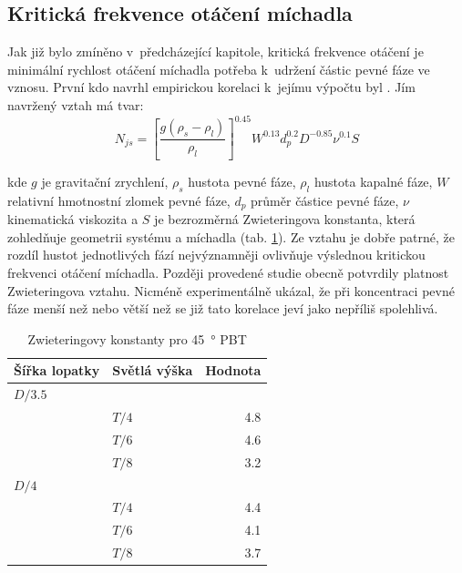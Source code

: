 \subsection{Kritická frekvence otáčení míchadla}
Jak již bylo zmíněno v~předcházející kapitole, kritická frekvence otáčení je minimální rychlost otáčení míchadla potřeba k~udržení částic pevné fáze ve vznosu. První kdo navrhl empirickou korelaci k~jejímu výpočtu byl \citet{zwi58}. Jím navržený vztah má tvar:
\begin{equation}
	N_{js} = \left[\frac{g(\rho_{s}-\rho_{l})}{\rho_{l}}\right]^{\num{0.45}}W^{\num{0.13}}d_{p}^{\num{0.2}}D^{\num{-0.85}}\nu^{\num{0.1}}S
	\label{eq:nkrit}
\end{equation} 

\noindent kde $g$ je gravitační zrychlení, $\rho_{s}$ hustota pevné fáze, $\rho_{l}$ hustota kapalné fáze, $W$ relativní hmotnostní zlomek pevné fáze, $d_{p}$ průměr částice pevné fáze, $\nu$ kinematická viskozita a $S$ je bezrozměrná Zwieteringova konstanta, která zohledňuje geometrii systému a míchadla (tab. \ref{tab:S}). Ze vztahu je dobře patrné, že rozdíl hustot jednotlivých fází nejvýznamněji ovlivňuje výslednou kritickou frekvenci otáčení míchadla. Později provedené studie \citep{nie68,bal78,chou97} obecně potvrdily platnost Zwieteringova vztahu. Nicméně \citet{chou97} experimentálně ukázal, že při koncentraci pevné fáze menší než  nebo větší než  se již tato korelace jeví jako nepříliš spolehlivá.

\begin{table}[h!]
\begin{center}
\caption{Zwieteringovy konstanty pro \SI{45}{\degree} PBT}
\label{tab:S}
\begin{tabular}{llr}
\toprule
Šířka lopatky & Světlá výška & Hodnota \\
\midrule

$D/\num{3.5}$ \\
& $T/4$ & \num{4.8} \\
& $T/6$ & \num{4.6} \\
& $T/8$ & \num{3.2} \\
$D/4$ \\
& $T/4$ & \num{4.4} \\
& $T/6$ & \num{4.1} \\
& $T/8$ & \num{3.7} \\

\bottomrule
\end{tabular}
\end{center}
\end{table}

